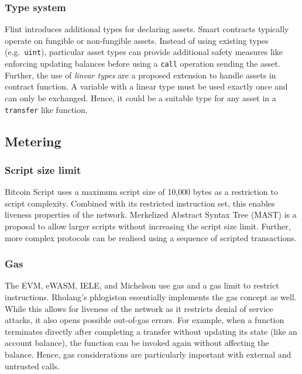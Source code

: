 \subsubsection{Type system}
Flint introduces additional types for declaring assets. Smart contracts typically operate on fungible or non-fungible assets. Instead of using existing types (e.g.\ \texttt{uint}), particular asset types can provide additional safety measures like enforcing updating balances before using a \texttt{call} operation sending the asset.
Further, the use of \emph{linear types} are a proposed extension to handle assets in contract function.
A variable with a linear type must be used exactly once and can only be exchanged.
Hence, it could be a suitable type for any asset in a \texttt{transfer} like function.



\subsection{Metering}

\subsubsection{Script size limit}
Bitcoin Script uses a maximum script size of 10,000 bytes as a restriction to script complexity. 
Combined with its restricted instruction set, this enables liveness properties of the network. 
Merkelized Abstract Syntax Tree (MAST) is a proposal to allow larger scripts without increasing the script size limit.
Further, more complex protocols can be realised using a sequence of scripted transactions.

\subsubsection{Gas}
The EVM, eWASM, IELE, and Michelson use gas and a gas limit to restrict instructions. Rholang's phlogiston essentially implements the gas concept as well. While this allows for liveness of the network as it restricts denial of service attacks, it also opens possible out-of-gas errors. For example, when a function terminates directly after completing a transfer without updating its state (like an account balance), the function can be invoked again without affecting the balance.
Hence, gas considerations are particularly important with external and untrusted calls.



